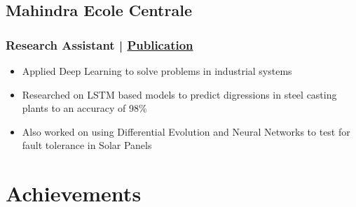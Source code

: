 \documentclass{article}
\begin{document}
\subsection{Mahindra Ecole Centrale  \null\hfill{}}
\subsubsection{Research Assistant | \href{https://ieeexplore.ieee.org/document/9242866}{Publication}}
\begin{itemize}[leftmargin=1em]


	\setlength\itemsep{-0.4em}

	\normalfont

	\item Applied Deep Learning to solve problems in industrial systems

	\item Researched on LSTM based models to predict digressions in steel casting plants to an accuracy of 98\%
	\item Also worked on using Differential Evolution and Neural Networks to test for fault tolerance in Solar Panels

\end{itemize}








\section{Achievements}
\end{document}
